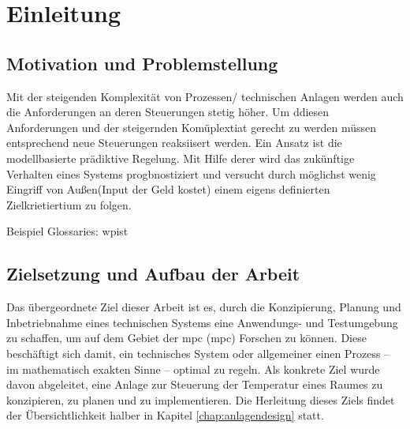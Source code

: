 %
%

\renewcommand{\chapterheadstartvskip}{\vspace*{3cm}}
\chapter{Einleitung}
\label{chap:einleitung}
\setcounter{page}{1}
\renewcommand{\chapterheadstartvskip}{\vspace*{-1cm}}


\section{Motivation und Problemstellung}
\label{sec:motivation}
Mit der steigenden Komplexität von Prozessen/ technischen Anlagen werden auch die Anforderungen an deren Steuerungen stetig höher. Um ddiesen Anforderungen und der steigernden Komüplextiat gerecht zu werden müssen entsprechend neue Steuerungen reaksiisert werden. Ein Ansatz ist die modellbasierte prädiktive Regelung. Mit Hilfe derer wird das zukünftige Verhalten eines Systems progbnostiziert und versucht durch möglichst wenig Eingriff von Außen(Input der Geld kostet) einem eigens definierten Zielkrietiertium zu folgen.

Beispiel Glossaries: \gls{wpist}

\section{Zielsetzung und Aufbau der Arbeit}
\label{sec:ziel}
Das übergeordnete Ziel dieser Arbeit ist es, durch die Konzipierung, Planung und Inbetriebnahme eines technischen Systems eine Anwendungs- und Testumgebung zu schaffen, um auf dem Gebiet der \acrlong{mpc} (\acrshort{mpc}) Forschen zu können.
Diese beschäftigt sich damit, ein technisches System oder allgemeiner einen Prozess -- im mathematisch exakten Sinne -- optimal zu regeln.
Als konkrete Ziel wurde davon abgeleitet, eine Anlage zur Steuerung der Temperatur eines Raumes zu konzipieren, zu planen und zu implementieren. 
Die Herleitung dieses Ziels findet der Übersichtlichkeit halber in Kapitel \ref{chap:anlagendesign} statt.

